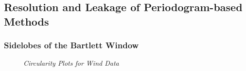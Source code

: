 \documentclass[./main.tex]{subfiles}
\begin{document}
	
\subsection{Resolution and Leakage of Periodogram-based Methods}

\subsubsection{Sidelobes of the Bartlett Window}

\begin{figure}[h]
	\centering 
	\resizebox{\textwidth}{!}{}
	\caption{\textit{Circularity Plots for Wind Data}}
	\label{fig:}
\end{figure}
%

\begin{minipage}{.5\textwidth}
		\center
		\resizebox{\textwidth}{!}{}
		\label{fig:}
\end{minipage}
\begin{minipage}{.5\textwidth}
	\center
	\resizebox{\textwidth}{!}{}
	\label{fig:}
\end{minipage}
\end{document}
